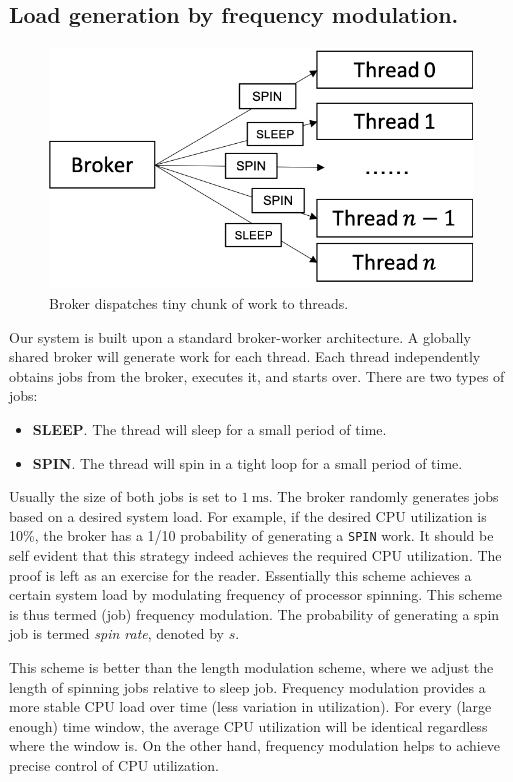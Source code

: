 \documentclass[conference]{IEEEtran}
\begin{document}
\subsection{Load generation by frequency modulation.}
\begin{figure}[htbp]
\centerline{\includegraphics[scale=.5]{fig/broker.png}}
\caption{Broker dispatches tiny chunk of work to threads.}
\label{arch}
\end{figure}

Our system is built upon a standard broker-worker architecture. A globally shared broker
will generate work for each thread. Each thread independently obtains jobs from the broker, 
executes it, and starts over. There are two types of jobs:

\begin{itemize}
\item \textbf{SLEEP}. The thread will sleep for a small period of time.
\item \textbf{SPIN}. The thread will spin in a tight loop for a small period of time.
\end{itemize}

Usually the size of both jobs is set to $1~\textrm{ms}$. The broker randomly generates jobs
based on a desired system load. For example, if the desired CPU utilization is 10\%, the 
broker has a 1/10 probability of generating a \texttt{SPIN} work. It should be self evident
that this strategy indeed achieves the required CPU utilization. The proof is left as an exercise
for the reader. Essentially this scheme achieves a certain system load by modulating 
frequency of processor spinning. This scheme is thus termed (job) frequency modulation. The
probability of generating a spin job is termed \textit{spin rate}, denoted by $s$.

This scheme is better than the length modulation scheme, where we adjust the length of 
spinning jobs relative to sleep job. Frequency modulation provides a more stable CPU
load over time (less variation in utilization). For every (large enough) time window, 
the average CPU utilization will be identical regardless where the window is. On the other
hand, frequency modulation helps to achieve precise control of CPU utilization.
\end{document}
